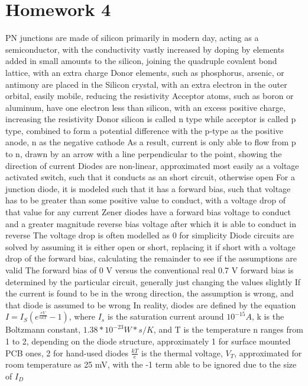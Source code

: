 \documentclass[11 pt, twoside]{article}
\newenvironment{outline*}
{
	\begin{outline}[enumerate]
	}
	{\end{outline}
}
\begin{document}
\section{Homework 4}
\begin{outline*}
\1 PN junctions are made of silicon primarily in modern day, acting as a semiconductor, with the conductivity vastly increased by doping by elements added in small amounts to the silicon, joining the quadruple covalent bond lattice, with an extra charge
	\2 Donor elements, such as phosphorus, arsenic, or antimony are placed in the Silicon crystal, with an extra electron in the outer orbital, easily mobile, reducing the resistivity
	\2 Acceptor atoms, such as boron or aluminum, have one electron less than silicon, with an excess positive charge, increasing the resistivity
	\2 Donor silicon is called n type while acceptor is called p type, combined to form a potential difference with the p-type as the positive anode, n as the negative cathode
		\3 As a result, current is only able to flow from p to n, drawn by an arrow with a line perpendicular to the point, showing the direction of current
\1 Diodes are non-linear, approximated most easily as a voltage activated switch, such that it conducts as an short circuit, otherwise open
	\2 For a junction diode, it is modeled such that it has a forward bias, such that voltage has to be greater than some positive value to conduct, with a voltage drop of that value for any current
		\3 Zener diodes have a forward bias voltage to conduct and a greater magnitude reverse bias voltage after which it is able to conduct in reverse
		\3 The voltage drop is often modelled as 0 for simplicity
	\2 Diode circuits are solved by assuming it is either open or short, replacing it if short with a voltage drop of the forward bias, calculating the remainder to see if the assumptions are valid
		\3 The forward bias of 0 V versus the conventional real 0.7 V forward bias is determined by the particular circuit, generally just changing the values slightly
		\3 If the current is found to be in the wrong direction, the assumption is wrong, and that diode is assumed to be wrong
	\2 In reality, diodes are defined by the equation $I = I_S(e^{\frac{eV}{nkT}} - 1)$, where $I_s$ is the saturation current around $10^{-15} A$, k is the Boltzmann constant, $1.38 * 10^{-23} W*s/K$, and T is the temperature
		\3 n ranges from 1 to 2, depending on the diode structure, approximately 1 for surface mounted PCB ones, 2 for hand-used diodes
		\3 $\frac{kT}{e}$ is the thermal voltage, $V_T$, approximated for room temperature as 25 mV, with the -1 term able to be ignored due to the size of $I_D$

\end{outline*}
\end{document}
